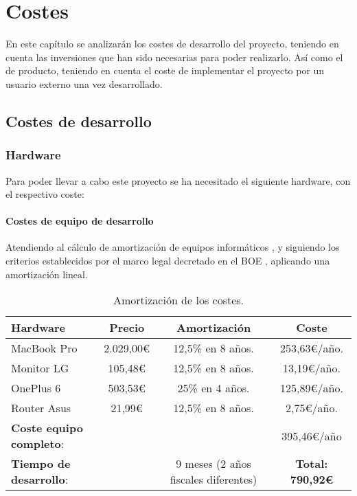 \chapter{Costes}
En este capítulo se analizarán los costes de desarrollo del proyecto, teniendo
en cuenta las inversiones que han sido necesarias para poder realizarlo. Así
como el de producto, teniendo en cuenta el coste de implementar el
proyecto por un usuario externo una vez desarrollado.

\section{Costes de desarrollo}

\subsection{Hardware}

Para poder llevar a cabo este proyecto se ha necesitado el siguiente hardware,
con el respectivo coste:

\subsubsection{Costes de equipo de desarrollo}

Atendiendo al cálculo de amortización de equipos informáticos
\cite{costes-explicacion}, y siguiendo los criterios establecidos por el marco
legal decretado en el BOE \cite{costes-boe}, aplicando una amortización lineal.

\begin{table}[H]
    \begin{center}
    \begin{tabular}{| l | c | c | c |}
        \hline
        \textbf{Hardware} & \textbf{Precio} & \textbf{Amortización} & \textbf{Coste} \\ \hline
        MacBook Pro & 2.029,00\euro & 12,5\% en 8 años. & 253,63\euro/año.\\
        Monitor LG & 105,48\euro & 12,5\% en 8 años. & 13,19\euro/año.\\
        OnePlus 6 & 503,53\euro & 25\% en 4 años. & 125,89\euro/año.\\
        Router Asus & 21,99\euro & 12,5\% en 8 años. & 2,75\euro/año.\\ \hline
        \textbf{Coste equipo completo}: & & & 395,46\euro/año \\ \hline
        \textbf{Tiempo de desarrollo}: & & 9 meses (2 años fiscales diferentes) & \textbf{Total: 790,92\euro} \\ \hline
    \end{tabular}
    \caption{Amortización de los costes.}
    \label{tab:costes-hardware-desarrollo}
    \end{center}
\end{table} 

